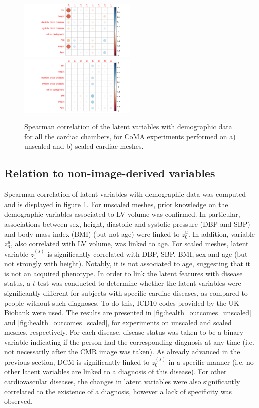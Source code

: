 \begin{figure}[ht!]
\includegraphics[width=0.5\textwidth]{figs/correlation/experiment_2_vs_demographic_data}
\includegraphics[width=0.5\textwidth]{figs/correlation/experiment_1_vs_demographic_data}
\caption{Spearman correlation of the latent variables with demographic data for all the cardiac chambers, for CoMA experiments performed on a) unscaled and b) scaled cardiac meshes.}
\label{fig:relation_to_demographic}
\end{figure}


\subsection*{Relation to non-image-derived variables}
\label{subsec_demographic_var}
Spearman correlation of latent variables with demographic data was computed and is displayed in figure \ref{fig:relation_to_demographic}.
For unscaled meshes, prior knowledge on the demographic variables associated to LV volume was confirmed. In particular, associations between sex, height, diastolic and systolic pressure (DBP and SBP) and body-mass index (BMI) (but not age) were linked to $z_0^{u}$. In addition, variable $z_6^{u}$, also correlated with LV volume, was linked to age. For scaled meshes, latent variable $z_1^{(s)}$ is significantly correlated with DBP, SBP, BMI, sex and age (but not strongly with height). Notably, it is not associated to age, suggesting that it is not an acquired phenotype.
In order to link the latent features with disease status, a $t$-test was conducted to determine whether the latent variables were significantly different for subjects with specific cardiac diseases, as compared to people without such diagnoses. To do this, ICD10 codes provided by the UK Biobank were used. The results are presented in \ref{fig:health_outcomes_unscaled} and \ref{fig:health_outcomes_scaled}, for experiments on unscaled and scaled meshes, respectively. For each disease, disease status was taken to be a binary variable indicating if the person had the corresponding diagnosis at any time (i.e. not necessarily after the CMR image was taken). As already advanced in the previous section, DCM is significantly linked to $z_0^{(s)}$ in a specific manner (i.e. no other latent variables are linked to a diagnosis of this disease). For other cardiovascular diseases, the changes in latent variables were also significantly correlated to the existence of a diagnosis, however a lack of specificity was observed.

